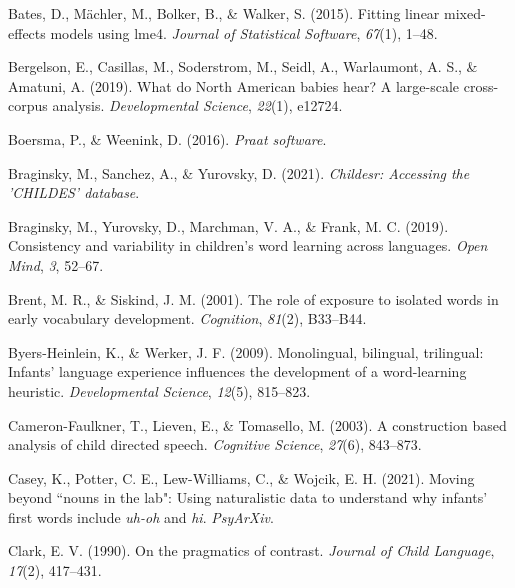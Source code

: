 \documentclass[10pt, letterpaper]{article}
\newenvironment{CSLReferences}%
  {}%
  {\par}
\begin{document}
\hypertarget{refs}{}
\begin{CSLReferences}
\leavevmode\hypertarget{ref-bates2015fitting}{}%
Bates, D., Mächler, M., Bolker, B., \& Walker, S. (2015). Fitting linear
mixed-effects models using {lme4}. \emph{Journal of Statistical
Software}, \emph{67}(1), 1--48.

\leavevmode\hypertarget{ref-bergelson2019north}{}%
Bergelson, E., Casillas, M., Soderstrom, M., Seidl, A., Warlaumont, A.
S., \& Amatuni, A. (2019). What do {North American} babies hear? A
large-scale cross-corpus analysis. \emph{Developmental Science},
\emph{22}(1), e12724.

\leavevmode\hypertarget{ref-boersma2016praat}{}%
Boersma, P., \& Weenink, D. (2016). \emph{Praat software}.

\leavevmode\hypertarget{ref-braginsky2021childesr}{}%
Braginsky, M., Sanchez, A., \& Yurovsky, D. (2021). \emph{Childesr:
Accessing the 'CHILDES' database}.

\leavevmode\hypertarget{ref-braginsky2019consistency}{}%
Braginsky, M., Yurovsky, D., Marchman, V. A., \& Frank, M. C. (2019).
Consistency and variability in children's word learning across
languages. \emph{Open Mind}, \emph{3}, 52--67.

\leavevmode\hypertarget{ref-brent2001role}{}%
Brent, M. R., \& Siskind, J. M. (2001). The role of exposure to isolated
words in early vocabulary development. \emph{Cognition}, \emph{81}(2),
B33--B44.

\leavevmode\hypertarget{ref-byers2009monolingual}{}%
Byers-Heinlein, K., \& Werker, J. F. (2009). Monolingual, bilingual,
trilingual: Infants' language experience influences the development of a
word-learning heuristic. \emph{Developmental Science}, \emph{12}(5),
815--823.

\leavevmode\hypertarget{ref-cameron2003construction}{}%
Cameron-Faulkner, T., Lieven, E., \& Tomasello, M. (2003). A
construction based analysis of child directed speech. \emph{Cognitive
Science}, \emph{27}(6), 843--873.

\leavevmode\hypertarget{ref-caseyURmoving}{}%
Casey, K., Potter, C. E., Lew-Williams, C., \& Wojcik, E. H. (2021).
Moving beyond ``nouns in the lab": Using naturalistic data to understand
why infants' first words include \emph{uh-oh} and \emph{hi}. \emph{PsyArXiv}.

\leavevmode\hypertarget{ref-clark1990pragmatics}{}%
Clark, E. V. (1990). On the pragmatics of contrast. \emph{Journal of
Child Language}, \emph{17}(2), 417--431.


\end{CSLReferences}
\end{document}
